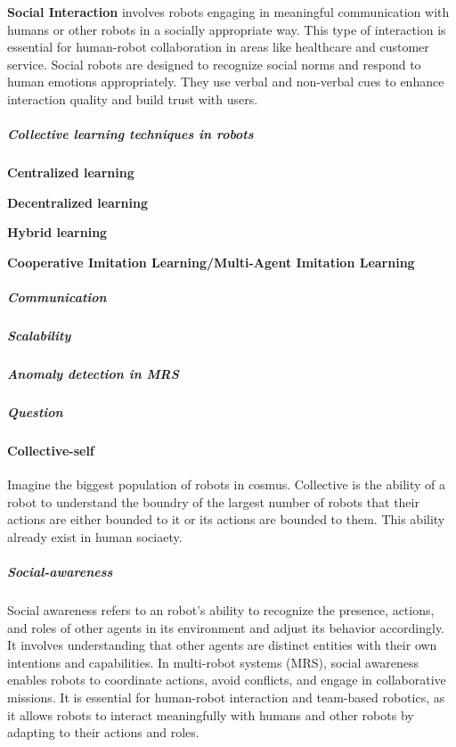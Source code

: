 \documentclass{book}
\begin{document}
\textbf{Social Interaction} involves robots engaging in meaningful communication with humans or other robots in a socially appropriate way. This type of interaction is essential for human-robot collaboration in areas like healthcare and customer service. Social robots are designed to recognize social norms and respond to human emotions appropriately. They use verbal and non-verbal cues to enhance interaction quality and build trust with users. 


\subparagraph{Collective learning techniques in robots}
\textbf{Centralized learning}

\textbf{Decentralized learning}

\textbf{Hybrid learning}

\textbf{Cooperative Imitation Learning/Multi-Agent Imitation Learning}


\subparagraph{Communication}


\subparagraph{Scalability}


\subparagraph{Anomaly detection in MRS}


\subparagraph{Question}


\paragraph{Collective-self}
Imagine the biggest population of robots in cosmus. Collective is the ability of a robot to understand the boundry of the largest number of robots that their actions are either bounded to it or its actions are bounded to them. This ability already exist in human sociaety.


\subparagraph{Social-awareness}
Social awareness refers to an robot's ability to recognize the presence, actions, and roles of other agents in its environment and adjust its behavior accordingly. It involves understanding that other agents are distinct entities with their own intentions and capabilities. In multi-robot systems (MRS), social awareness enables robots to coordinate actions, avoid conflicts, and engage in collaborative missions. It is essential for human-robot interaction and team-based robotics, as it allows robots to interact meaningfully with humans and other robots by adapting to their actions and roles.
\end{document}
